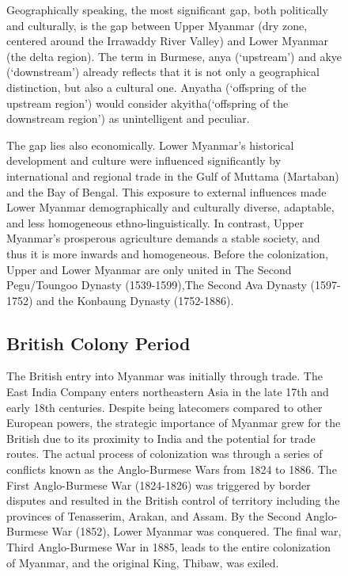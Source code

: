 \documentclass{article}
\begin{document}
\begin{figure}[H]
{{Geographically speaking, the most significant gap, both politically and culturally, is the gap between Upper Myanmar (dry zone, centered around the Irrawaddy River Valley) and Lower Myanmar (the delta region). The term in Burmese, anya (`upstream') and akye (`downstream') already reflects that it is not only a geographical distinction, but also a cultural one. Anyatha (`offspring of the upstream region’) would consider akyitha(`offspring of the downstream region’) as unintelligent and peculiar. \autocite[43,142]{aung-thwinHistoryMyanmarAncient2012}

The gap lies also economically. Lower Myanmar's historical development and culture were influenced significantly by international and regional trade in the Gulf of Muttama (Martaban) and the Bay of Bengal. This exposure to external influences made Lower Myanmar demographically and culturally diverse, adaptable, and less homogeneous ethno-linguistically. In contrast, Upper Myanmar's prosperous agriculture demands a stable society, and thus it is more inwards and homogeneous. Before the colonization, Upper and Lower Myanmar are only united in The Second Pegu/Toungoo Dynasty (1539-1599),The Second Ava Dynasty (1597-1752) and the Konbaung Dynasty (1752-1886).~\autocite[33,44,130]{aung-thwinHistoryMyanmarAncient2012}

\subsection{British Colony Period}

The British entry into Myanmar was initially through trade. The East India Company enters northeastern Asia in the late 17th and early 18th centuries. Despite being latecomers compared to other European powers, the strategic importance of Myanmar grew for the British due to its proximity to India and the potential for trade routes. The actual process of colonization was through a series of conflicts known as the Anglo-Burmese Wars from 1824 to 1886. The First Anglo-Burmese War (1824-1826) was triggered by border disputes and resulted in the British control of territory including the provinces of Tenasserim, Arakan, and Assam. By the Second Anglo-Burmese War (1852), Lower Myanmar was conquered. The final war, Third Anglo-Burmese War in 1885, leads to the entire colonization of Myanmar, and the original King, Thibaw, was exiled.~\autocite[174-194]{aung-thwinHistoryMyanmarAncient2012}

}}
\end{figure}
\end{document}
